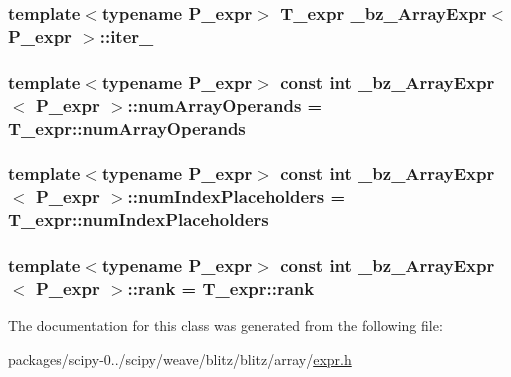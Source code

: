 \subsubsection[{iter\+\_\+}]{\setlength{\rightskip}{0pt plus 5cm}template$<$typename P\+\_\+expr$>$ {\bf T\+\_\+expr} {\bf \+\_\+bz\+\_\+\+Array\+Expr}$<$ P\+\_\+expr $>$\+::iter\+\_\+\hspace{0.3cm}{\ttfamily [protected]}}\label{class__bz__ArrayExpr_aa333bbbf4062d39da6466cef8330d5b5}
\hypertarget{class__bz__ArrayExpr_a592183de972c5d094677ce767b0ca68b}{}
\subsubsection[{num\+Array\+Operands}]{\setlength{\rightskip}{0pt plus 5cm}template$<$typename P\+\_\+expr$>$ const int {\bf \+\_\+bz\+\_\+\+Array\+Expr}$<$ P\+\_\+expr $>$\+::num\+Array\+Operands = T\+\_\+expr\+::num\+Array\+Operands\hspace{0.3cm}{\ttfamily [static]}}\label{class__bz__ArrayExpr_a592183de972c5d094677ce767b0ca68b}
\hypertarget{class__bz__ArrayExpr_abbc27ae7cbbf90b7509c5c66a3e94ce6}{}
\subsubsection[{num\+Index\+Placeholders}]{\setlength{\rightskip}{0pt plus 5cm}template$<$typename P\+\_\+expr$>$ const int {\bf \+\_\+bz\+\_\+\+Array\+Expr}$<$ P\+\_\+expr $>$\+::num\+Index\+Placeholders = T\+\_\+expr\+::num\+Index\+Placeholders\hspace{0.3cm}{\ttfamily [static]}}\label{class__bz__ArrayExpr_abbc27ae7cbbf90b7509c5c66a3e94ce6}
\hypertarget{class__bz__ArrayExpr_aba2f516b84f2a7a0c04e0d01dbba3fd3}{}
\subsubsection[{rank}]{\setlength{\rightskip}{0pt plus 5cm}template$<$typename P\+\_\+expr$>$ const int {\bf \+\_\+bz\+\_\+\+Array\+Expr}$<$ P\+\_\+expr $>$\+::rank = T\+\_\+expr\+::rank\hspace{0.3cm}{\ttfamily [static]}}\label{class__bz__ArrayExpr_aba2f516b84f2a7a0c04e0d01dbba3fd3}


The documentation for this class was generated from the following file\+:\begin{DoxyCompactItemize}
\item 
packages/scipy-\/0../scipy/weave/blitz/blitz/array/\hyperlink{expr_8h}{expr.\+h}\end{DoxyCompactItemize}
